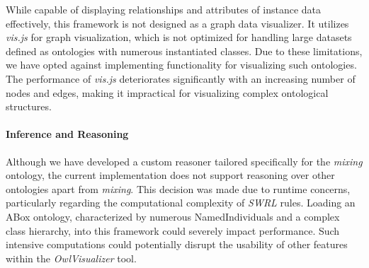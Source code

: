 While capable of displaying relationships and attributes of instance data effectively, 
this framework is not designed as a graph data visualizer. 
It utilizes \textit{vis.js} for graph visualization, which is not optimized for handling large datasets defined as ontologies with numerous instantiated classes.
Due to these limitations, we have opted against implementing functionality for visualizing such ontologies. 
The performance of \textit{vis.js} deteriorates significantly with an increasing number of nodes and edges, 
making it impractical for visualizing complex ontological structures.

\paragraph{Inference and Reasoning}

Although we have developed a custom reasoner tailored specifically for the \textit{mixing} ontology, 
the current implementation does not support reasoning over other ontologies apart from \textit{mixing}. 
This decision was made due to runtime concerns, particularly regarding the computational complexity of \textit{SWRL} rules. 
Loading an ABox ontology, characterized by numerous NamedIndividuals and a complex class hierarchy, into this framework could severely impact performance.
Such intensive computations could potentially disrupt the usability of other features within the \textit{OwlVisualizer} tool.